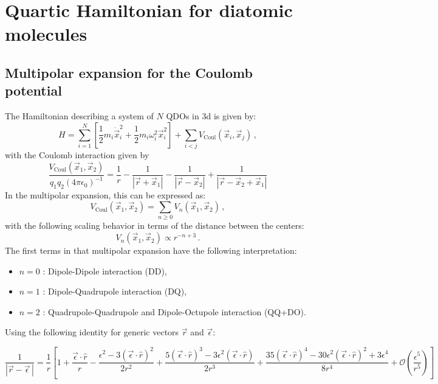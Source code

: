 \documentclass[reprint, amsmath, amssymb, aps, prl]{revtex4-2}
\begin{document}
\section{Quartic Hamiltonian for diatomic molecules}

    \subsection{Multipolar expansion for the Coulomb potential}

        The Hamiltonian describing a system of $N$ QDOs in 3d is given by:
        \begin{equation}
        \label{eq:full_QDO_Hamiltonian}
            H=\sum_{i=1}^N\left[\frac{1}{2}m_i\dot{\vec x}_i^2 + \frac{1}{2}m_i\omega_i^2\vec x_i^2\right] +\sum_{i<j}V_\text{Coul}\left(\vec x_i, \vec x_j\right)\,,
        \end{equation}
        with the Coulomb interaction given by
        \begin{equation*}
            \frac{V_\text{Coul}\left(\vec x_1, \vec x_2\right)}{q_1q_2(4\pi\epsilon_0)^{-1}}=\frac{1}{r} - \frac{1}{|\vec r + \vec x_1|} - \frac{1}{|\vec r - \vec x_2|} + \frac{1}{|\vec r - \vec x_2 + \vec x_1|}
        \end{equation*}
        In the multipolar expansion, this can be expressed as:
        \begin{equation}
            V_\text{Coul}\left(\vec x_1, \vec x_2\right)= \sum_{n\geq 0} V_n\left(\vec x_1, \vec x_2\right)\,,
        \end{equation}
        with the following scaling behavior in terms of the distance between the centers:
        \begin{equation}
            V_n\left(\vec x_1, \vec x_2\right)\propto r^{-n+3}\,.
        \end{equation}
        The first terms in that multipolar expansion have the following interpretation:
        \begin{itemize}
            \item $n=0$ : Dipole-Dipole interaction (DD),
            \item $n=1$ : Dipole-Quadrupole interaction (DQ),
            \item $n=2$ : Quadrupole-Quadrupole and Dipole-Octupole interaction (QQ+DO).
        \end{itemize}
        Using the following identity for generic vectors $\vec r$ and $\vec \epsilon$:
        \begin{widetext}
        \begin{equation}
            \frac{1}{\left|\vec r - \vec\epsilon\,\right|} = \frac{1}{r}\left[1 + \frac{\vec\epsilon\cdot\hat r}{r} - \frac{\epsilon^2 - 3(\vec\epsilon\cdot\hat r)^2}{2r^2}+\frac{5(\vec\epsilon\cdot\hat r)^3-3\epsilon^2(\vec\epsilon\cdot\hat r)}{2r^3}+\frac{35(\vec\epsilon\cdot\hat r)^4-30\epsilon^2(\vec\epsilon\cdot\hat r)^2+3\epsilon^4}{8r^4}+\mathcal O\left(\frac{\epsilon^5}{r^5}\right)\right]
        \end{equation}
        \end{widetext}
\end{document}
